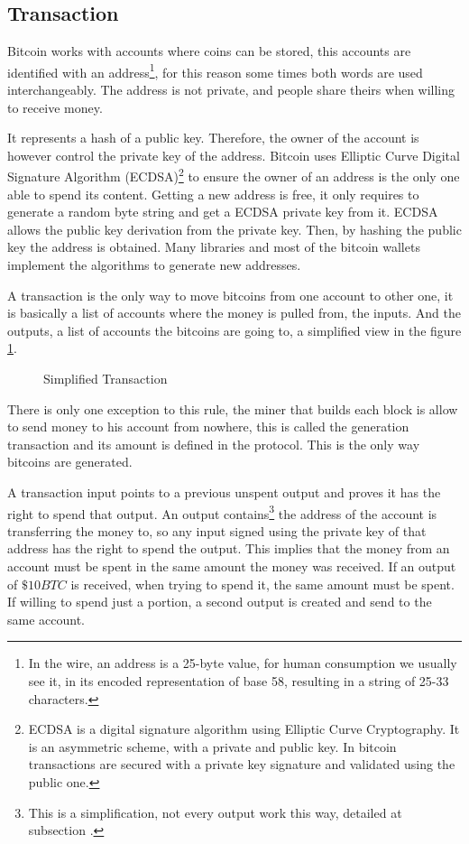 \subsection{Transaction}\label{subsec:Transaction}
Bitcoin works with accounts where coins can be stored, this accounts are
  identified with an address\footnote{
  In the wire, an address is a 25-byte value, for human consumption we usually
    see it, in its encoded representation of base 58, resulting in a string of
    25-33 characters.}, for this reason some times both words are used
  interchangeably.
The address is not private, and people share theirs when willing to receive
  money.

It represents a hash of a public key. Therefore, the owner of the account is
  however control the private key of the address.
Bitcoin uses Elliptic Curve Digital Signature Algorithm (ECDSA)\footnote{
  ECDSA is a digital signature algorithm using Elliptic Curve
    Cryptography. It is an asymmetric scheme, with a private and public key. In
    bitcoin transactions are secured with a private key signature and validated
    using the public one.} to ensure the owner of an address is the only one able
  to spend its content.
Getting a new address is free, it only requires to generate a random byte string
  and get a ECDSA private key from it. ECDSA allows the public key derivation
  from the private key. Then, by hashing the public key the address is obtained.
Many libraries and most of the bitcoin wallets implement the algorithms to
  generate new addresses.

A transaction is the only way to move bitcoins from one account to other one,
  it is basically a list of accounts where the money is pulled from, the
  inputs.
And the outputs, a list of accounts the bitcoins are going to, a simplified
  view in the figure \ref{fig:simplified_transaction}.

\begin{figure}
	\centering
	
	\caption{Simplified Transaction}
	\label{fig:simplified_transaction}
\end{figure}

There is only one exception to this rule, the miner that builds each block is
  allow to send money to his account from nowhere, this is called the generation
  transaction and its amount is defined in the protocol.
This is the only way bitcoins are generated.

A transaction input points to a previous unspent output and proves it has the
  right to spend that output.
An output contains\footnote{This is a simplification, not every output work this
  way, detailed at subsection \label{subsec:script}.} the address of the account
  is transferring the money to, so any input signed using the private key of
  that address has the right to spend the output.
This implies that the money from an account must be spent in the same amount
  the money was received. If an output of $\$ 10BTC$ is received, when trying
  to spend it, the same amount must be spent. If willing to spend just a
  portion, a second output is created and send to the same account.

